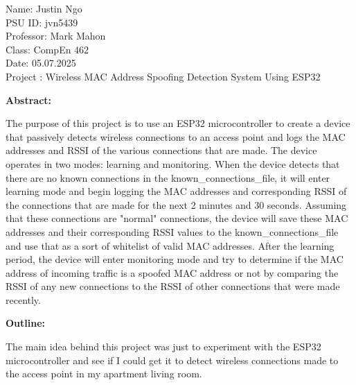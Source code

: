 \documentclass[letterpaper, 11pt]{article}
\def\class{CompEn 462}
\def\date{05.07.2025}
\def\professor{Mark Mahon}
\newcommand{\secHeader}[1]{\vspace{2mm} \noindent \textbf{#1:}\vspace{-4mm}}
\begin{document}
\hfill
\newline
Name: Justin Ngo
\\PSU ID: jvn5439
\\Professor: \professor
\\Class: \class
\\Date: \date
\\Project : Wireless MAC Address Spoofing Detection System Using ESP32

\newpage
\secHeader{Abstract}
\vspace{5mm}

The purpose of this project is to use an ESP32 microcontroller to create a device that passively detects wireless connections to an access point and logs the MAC addresses and RSSI of the various
connections that are made. The device operates in two modes: learning and monitoring. When the device detects that there are no known connections in the known\_connections\_file, it will enter
learning mode and begin logging the MAC addresses and corresponding RSSI of the connections that are made for the next 2 minutes and 30 seconds. Assuming that these connections are "normal" connections,
the device will save these MAC addresses and their corresponding RSSI values to the known\_connections\_file and use that as a sort of whitelist of valid MAC addresses. 
After the learning period, the device will enter monitoring mode and try to determine if the MAC address of incoming traffic is a spoofed MAC address or not by comparing the RSSI of any new connections
to the RSSI of other connections that were made recently. 


\newpage
\secHeader{Outline}
\vspace{5mm}

The main idea behind this project was just to experiment with the ESP32 microcontroller and see if I could get it to detect wireless connections made to the access point in my apartment living room.
\end{document}
